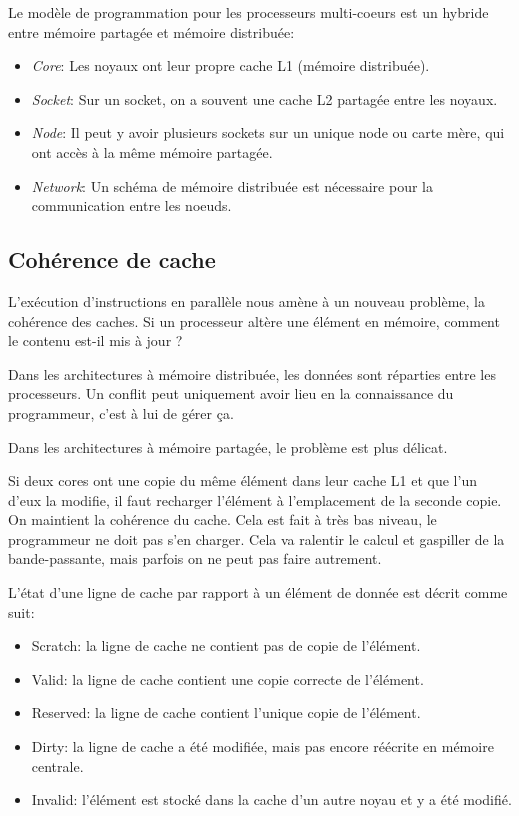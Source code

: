 Le modèle de programmation pour les processeurs multi-coeurs est un hybride entre mémoire partagée et mémoire distribuée:
\begin{itemize}
	\item \textit{Core}: Les noyaux ont leur propre cache L1 (mémoire distribuée).
	\item \textit{Socket}: Sur un socket, on a souvent une cache L2 partagée entre les noyaux.
	\item \textit{Node}: Il peut y avoir plusieurs sockets sur un unique node ou carte mère, qui ont accès à la même mémoire partagée.
	\item \textit{Network}: Un schéma de mémoire distribuée est nécessaire pour la communication entre les noeuds.
\end{itemize}

	\subsection{Cohérence de cache}

L'exécution d'instructions en parallèle nous amène à un nouveau problème, la cohérence des caches. Si un processeur altère une élément en mémoire, comment le contenu est-il mis à jour ?

Dans les architectures à mémoire distribuée, les données sont réparties entre les processeurs. Un conflit peut uniquement avoir lieu en la connaissance du programmeur, c'est à lui de gérer ça.

Dans les architectures à mémoire partagée, le problème est plus délicat. 

Si deux cores ont une copie du même élément dans leur cache L1 et que l'un d'eux la modifie, il faut recharger l'élément à l'emplacement de la seconde copie. On maintient la cohérence du cache. Cela est fait à très bas niveau, le programmeur ne doit pas s'en charger. Cela va ralentir le calcul et gaspiller de la bande-passante, mais parfois on ne peut pas faire autrement.

L'état d'une ligne de cache par rapport à un élément de donnée est décrit comme suit:
\begin{itemize}
	\item Scratch: la ligne de cache ne contient pas de copie de l'élément.
	\item Valid: la ligne de cache contient une copie correcte de l'élément.
	\item Reserved: la ligne de cache contient l'unique copie de l'élément.
	\item Dirty: la ligne de cache a été modifiée, mais pas encore réécrite en mémoire centrale.
	\item Invalid: l'élément est stocké dans la cache d'un autre noyau et y a été modifié.
\end{itemize}


